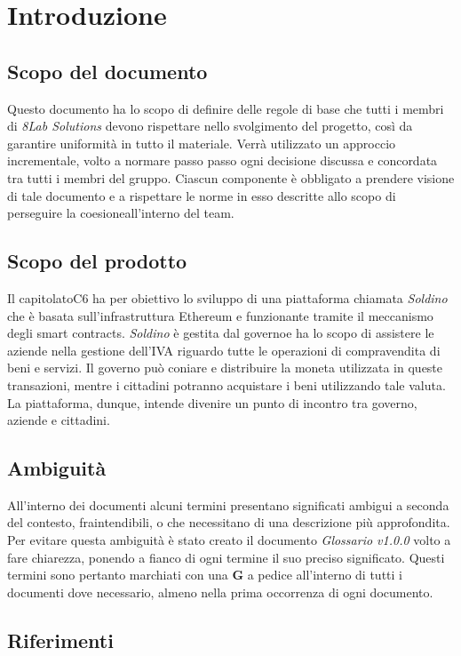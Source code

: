 \section{Introduzione}
\subsection{Scopo del documento}
Questo documento ha lo scopo di definire delle regole di base che tutti i membri 
di \textit{8Lab Solutions} devono rispettare nello svolgimento del progetto, 
così da garantire uniformità in tutto il materiale. Verrà utilizzato un 
approccio incrementale, volto a normare passo passo ogni decisione discussa e 
concordata tra tutti i membri del gruppo. Ciascun componente è obbligato a 
prendere visione di tale documento e a rispettare le norme in esso descritte 
allo scopo di perseguire la coesione\glosp all'interno del team.

\subsection{Scopo del prodotto}
Il capitolato\glosp C6 ha per obiettivo lo sviluppo di una piattaforma chiamata \textit{Soldino} che è basata sull'infrastruttura Ethereum\glo{} e funzionante tramite il meccanismo degli smart contracts\glo{}. \textit{Soldino} è gestita dal governo\glosp e ha lo scopo di assistere le aziende nella gestione dell'IVA riguardo tutte le operazioni di compravendita di beni e servizi. Il governo può coniare e 
distribuire la moneta utilizzata in queste transazioni, mentre i cittadini 
potranno acquistare i beni utilizzando tale valuta. La piattaforma, dunque, 
intende divenire un punto di incontro tra governo, aziende e cittadini.

\subsection{Ambiguità}
All'interno dei documenti alcuni termini presentano significati ambigui  a  
seconda del contesto, fraintendibili, o che necessitano di una descrizione più approfondita. Per evitare questa ambiguità è stato creato il documento 
\textit{Glossario v1.0.0} volto a fare chiarezza, ponendo a fianco di ogni 
termine il suo preciso significato. Questi termini sono pertanto marchiati con una \textbf{G} a pedice all'interno di tutti i documenti dove necessario, almeno nella prima occorrenza di ogni documento.

\subsection{Riferimenti}
